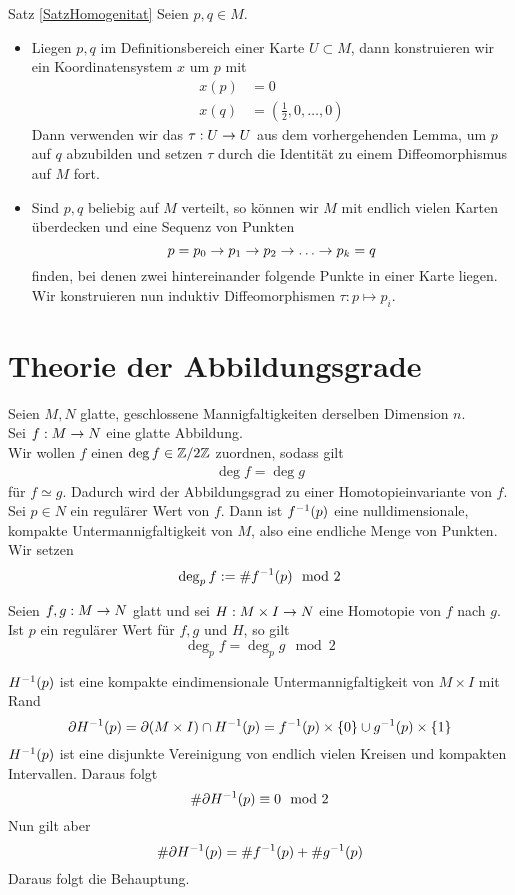\begin{Beweis}{Satz \ref{SatzHomogenitat}}
Seien $p, q \in M$.
\begin{itemize}
	\item Liegen $p,q$ im Definitionsbereich einer Karte $U \subset M$, dann konstruieren wir ein Koordinatensystem $x$ um $p$ mit
	\begin{align*}
	x(p) &= 0\\
	x(q) &= (\frac{1}{2}, 0, \ldots, 0)
	\end{align*}
	Dann verwenden wir das $\tau : U \overset{}{\rightarrow} U$ aus dem vorhergehenden Lemma, um $p$ auf $q$ abzubilden und setzen $\tau$ durch die Identität zu einem Diffeomorphismus auf $M$ fort.
	\item Sind $p,q$ beliebig auf $M$ verteilt, so können wir $M$ mit endlich vielen Karten überdecken und eine Sequenz von Punkten
	\[ p = p_0 \overset{}{\rightarrow} p_1 \overset{}{\rightarrow} p_2  \overset{}{\rightarrow} \ldots \overset{}{\rightarrow} p_k = q \]
	finden, bei denen zwei hintereinander folgende Punkte in einer Karte liegen. Wir konstruieren nun induktiv Diffeomorphismen $\tau : p \mapsto p_{i}$.
\end{itemize}
\end{Beweis}

\newpage
\section{Theorie der Abbildungsgrade}
Seien $M,N$ glatte, geschlossene Mannigfaltigkeiten derselben Dimension $n$. \\
Sei $f : M \overset{}{\rightarrow} N$ eine glatte Abbildung.\\
Wir wollen $f$ einen  $\deg f \in \mathbb{Z}/ 2\mathbb{Z}$ zuordnen, sodass gilt
\begin{align*}
\deg f = \deg g 
\end{align*}
für $f \simeq g$. Dadurch wird der Abbildungsgrad zu einer Homotopieinvariante von $f$.\\
Sei $p \in N$ ein regulärer Wert von $f$. Dann ist $f^{-1}(p)$ eine nulldimensionale, kompakte Untermannigfaltigkeit von $M$, also eine endliche Menge von Punkten. Wir setzen
\[ \deg_pf := \# f^{-1}(p) \mod 2 \]

\Lem{}
\label{GradLemma1}
Seien $f,g : M \overset{}{\rightarrow} N$ glatt und sei $H :M\times I \overset{}{\rightarrow} N$ eine Homotopie von $f$ nach $g$. Ist $p$ ein regulärer Wert für $f,g$ und $H$, so gilt
\[ \deg_pf = \deg_p g \mod 2 \]

\begin{Beweis}{}
	$H^{-1}(p)$ ist eine kompakte eindimensionale Untermannigfaltigkeit von $M \times I$ mit Rand
	\[ \partial H^{-1}(p) = \partial(M\times I) \cap H^{-1}(p) = f^{-1}(p) \times \{0\} \cup g^{-1}(p) \times \{1\} \]
	$H^{-1}(p)$ ist eine disjunkte Vereinigung von endlich vielen Kreisen und kompakten Intervallen. Daraus folgt
	\[ \# \partial H^{-1}(p) \equiv 0 \mod 2 \]
	Nun gilt aber
	\[ \# \partial H^{-1}(p) = \# f^{-1}(p) + \# g^{-1}(p) \]
	Daraus folgt die Behauptung.
\end{Beweis}

